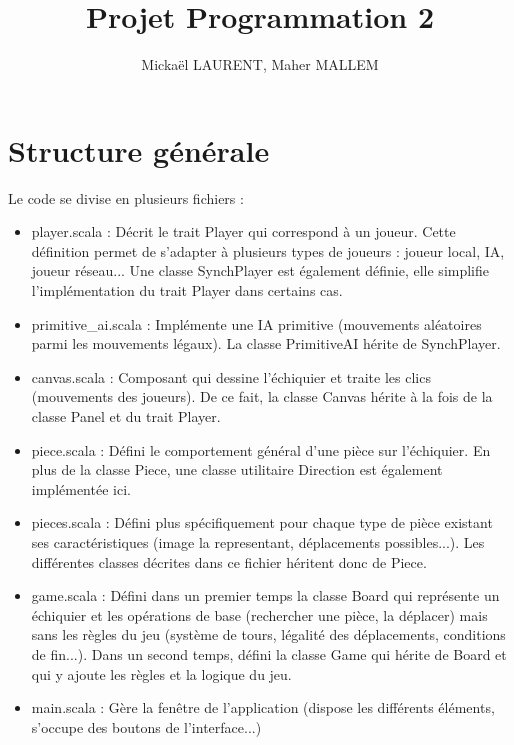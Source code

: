 \documentclass[11pt]{article}
\title{Projet Programmation 2}
\author{Mickaël LAURENT, Maher MALLEM}
\date{}
\begin{document}
\renewcommand{\labelitemi}{-}
\maketitle

\section{Structure générale}

Le code se divise en plusieurs fichiers :\newline
\begin{itemize}
\item player.scala : Décrit le trait Player qui correspond à un joueur. Cette définition permet de s'adapter à plusieurs types de joueurs : joueur local, IA, joueur réseau... Une classe SynchPlayer est également définie, elle simplifie l'implémentation du trait Player dans certains cas.\newline

\item primitive\_ai.scala : Implémente une IA primitive (mouvements aléatoires parmi les mouvements légaux). La classe PrimitiveAI hérite de SynchPlayer.\newline

\item canvas.scala : Composant qui dessine l'échiquier et traite les clics (mouvements des joueurs). De ce fait, la classe Canvas hérite à la fois de la classe Panel et du trait Player.\newline

\item piece.scala : Défini le comportement général d'une pièce sur l'échiquier. En plus de la classe Piece, une classe utilitaire Direction est également implémentée ici.\newline

\item pieces.scala : Défini plus spécifiquement pour chaque type de pièce existant ses caractéristiques (image la representant, déplacements possibles...). Les différentes classes décrites dans ce fichier héritent donc de Piece.\newline

\item game.scala : Défini dans un premier temps la classe Board qui représente un échiquier et les opérations de base (rechercher une pièce, la déplacer) mais sans les règles du jeu (système de tours, légalité des déplacements, conditions de fin...). Dans un second temps, défini la classe Game qui hérite de Board et qui y ajoute les règles et la logique du jeu.\newline

\item main.scala : Gère la fenêtre de l'application (dispose les différents éléments, s'occupe des boutons de l'interface...)
\end{itemize}
\-
\end{document}
